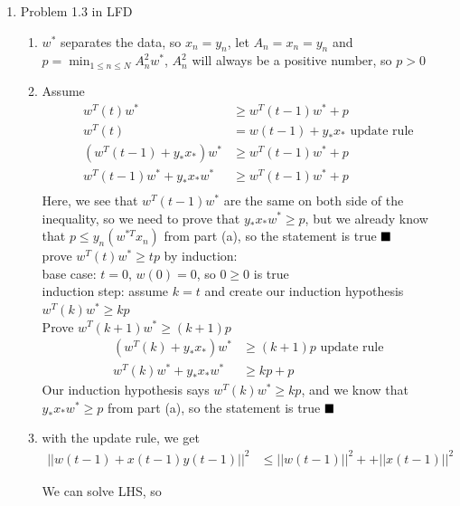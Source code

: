 \documentclass{article}
\begin{document}
\begin{enumerate}
        \item Problem 1.3 in LFD
        \begin{enumerate}[label=(\alph*)]
            \item $w^*$ separates the data, so $x_n = y_n$, let $A_n = x_n = y_n$ and $p = \min_{1 \leq n \leq N} A^2_nw^*$, $A^2_n$ will always be a positive number, so $p>0$
            \item Assume
            \begin{align*}
                w^T(t)w^* &\geq w^T(t-1)w^* + p\\
                w^T(t) &= w(t-1) + y_*x_* \text{ update rule}\\
                (w^T(t-1) + y_*x_*)w^* &\geq w^T(t-1)w^* + p\\
                w^T(t-1)w^* + y_*x_*w^* &\geq w^T(t-1)w^* + p\\
            \end{align*}
                Here, we see that $w^T(t-1)w^*$ are the same on both side of the inequality, so we need to prove that $y_*x_*w^* \geq p$, but we already know that $p \leq y_n(w^{*T}x_n)$ from part (a), so the statement is true $\hfill \blacksquare$
                \\[0.25in] prove $w^T(t)w^* \geq tp$ by induction:\\
                base case: $t=0$, $w(0) = 0$, so $0\geq0$ is true\\
                induction step: assume $k=t$ and create our induction hypothesis $w^T(k)w^* \geq kp$\\
                Prove $w^T(k+1)w^* \geq (k+1)p$
                \begin{align*}
                    (w^T(k) + y_*x_*)w^* &\geq (k+1)p \text{ update rule}\\
                    w^T(k)w^* + y_*x_*w^* &\geq kp + p
                \end{align*}
                Our induction hypothesis says $w^T(k)w^* \geq kp$, and we know that $y_*x_*w^* \geq p$ from part (a), so the statement is true $\hfill \blacksquare$
            
            \item with the update rule, we get
            \begin{align*}
                ||w(t-1) + x(t-1)y(t-1)||^2 &\leq ||w(t-1)||^2 + + ||x(t-1)||^2
            \end{align*}
            \begin{center}
                We can solve LHS, so
            \end{center}


\end{enumerate}
\end{enumerate}
\end{document}
